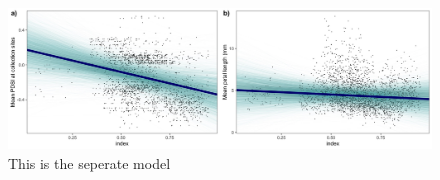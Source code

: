 \documentclass{article}[11pt]
\begin{document}
\begin{figure}[h!]
    \centering
 \includegraphics[width=.95\textwidth]{..//..//Plots/dataplots_SUPP.jpeg}
    \caption{This is the seperate model}
    \label{fig:seps}
\end{figure}
\end{document}
